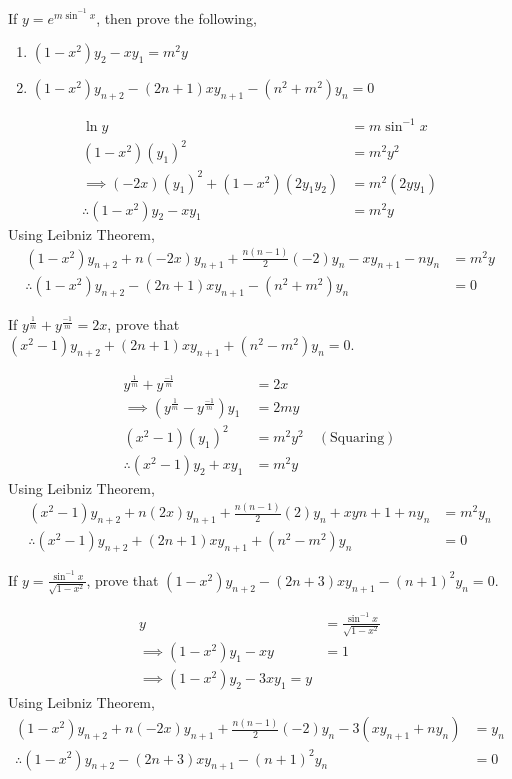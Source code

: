 \begin{asign}
	If $y=e^{m\sin^{-1}x}$, then prove the following,\begin{enumerate}
		\item $(1-x^2)y_2-xy_1=m^2y$
		\item $(1-x^2)y_{n+2}-(2n+1)xy_{n+1}-(n^2+m^2)y_n=0$
	\end{enumerate}
\end{asign}
\begin{anse}
	\[\begin{split}
		\ln y&=m\sin^{-1}x\\
		(1-x^2)(y_1)^2&=m^2y^2\\
		\implies (-2x)(y_1)^2+(1-x^2)(2y_1y_2)&=m^2(2yy_1)\\
		\therefore (1-x^2)y_2-xy_1&=m^2y
	\end{split}\]
	Using Leibniz Theorem,
	\[\begin{split}
		(1-x^2)y_{n+2}+n(-2x)y_{n+1}+\frac{n(n-1)}{2}(-2)y_n-xy_{n+1}-ny_n&=m^2y\\
		\therefore (1-x^2)y_{n+2}-(2n+1)xy_{n+1}-(n^2+m^2)y_n&=0
	\end{split}\]
\end{anse}
\begin{asign}
	If $y^\frac{1}{m}+y^\frac{-1}{m}=2x$, prove that $(x^2-1)y_{n+2}+(2n+1)xy_{n+1}+(n^2-m^2)y_n=0$.
\end{asign}
\begin{anse}
	\[\begin{split}
		y^\frac{1}{m}+y^\frac{-1}{m}&=2x\\
		\implies \left(y^\frac{1}{m}-y^\frac{-1}{m}\right)y_1&=2my\\
		(x^2-1)(y_1)^2&=m^2y^2 \quad (\text{Squaring})\\
		\therefore (x^2-1)y_2+xy_1&=m^2y
	\end{split}\]
	Using Leibniz Theorem,
	\[\begin{split}
		(x^2-1)y_{n+2}+n(2x)y_{n+1}+\frac{n(n-1)}{2}(2)y_n+xy{n+1}+ny_n&=m^2y_n\\
		\therefore (x^2-1)y_{n+2}+(2n+1)xy_{n+1}+(n^2-m^2)y_n&=0
	\end{split}\]
\end{anse}
\begin{asign}
	If $y=\frac{\sin^{-1}x}{\sqrt{1-x^2}}$, prove that $(1-x^2)y_{n+2}-(2n+3)xy_{n+1}-(n+1)^2y_n=0$.
\end{asign}
\begin{anse}
	\[\begin{split}
		y&=\frac{\sin^{-1}x}{\sqrt{1-x^2}}\\
		\implies (1-x^2)y_1-xy&=1\\
		\implies (1-x^2)y_2-3xy_1=y
	\end{split}\]
	Using Leibniz Theorem,
	\[\begin{split}
		(1-x^2)y_{n+2}+n(-2x)y_{n+1}+\frac{n(n-1)}{2}(-2)y_n-3(xy_{n+1}+ny_n)&=y_n\\
		\therefore (1-x^2)y_{n+2}-(2n+3)xy_{n+1}-(n+1)^2y_n&=0
	\end{split}\]
\end{anse}
